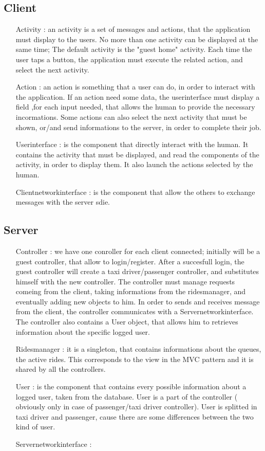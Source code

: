 	\subsection{Client}
	 \begin{itemize}
	  \item [Activity]: an activity is a set of messages and actions, that the application must display to the users.
	  No more than one activity can be displayed at the same time;
	  The default activity is the "guest home" activity. Each time the user taps a button, the application must execute
	  the related action, and select the next activity. 
	  \item [Action]: an action is something that a user can do, in order to interact with the application.
	  If an action need some data, the userinterface must display a field ,for each input needed, that allows the human
	  to provide the necessary incormations.
	  Some actions can also select the next activity that must be shown, or/and send informations to the server,
	  in order to complete their job.
	  \item [Userinterface]: is the component that directly interact with the human.
	  It contains the activity that must be displayed, and read the components of the activity, in order to display them.
	  It also launch the actions selected by the human.
	  \item[Clientnetworkinterface]: is the component that allow the others to exchange messages with the server sdie.
	 \end{itemize}
	\subsection{Server}
	\begin{itemize}
	 \item [Controller]: we have one conroller for each client connected; initially will be a guest controller,
	 that allow to login/register. After a succesfull login, the guest controller will create a taxi driver/passenger controller,
	 and substitutes himself with the new controller. The controller must manage requests comeing from
	 the client, taking informations from the ridesmanager, and eventually adding new objects to him.
	 In order to sends and receives message from the client, the controller communicates with a Servernetworkinterface.
	 The controller also contains a User object, that allows him to retrieves information about the specific logged user.
	 \item [Ridesmanager]: it is a singleton, that contains informations about the queues, the active rides. This corresponds 
	 to the view in the MVC pattern and it is shared by all the controllers.
	 \item [User]: is the component that contains every possible information about a logged user, taken from the database.
	 User is a part of the controller ( obviously only in case of passenger/taxi driver controller).
	 User is splitted in taxi driver and passenger, cause there are some differences between the two kind of user.
	 \item[Servernetworkinterface]:
	\end{itemize}
